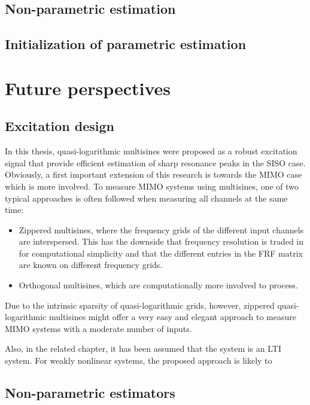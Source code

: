   \subsection{Non-parametric estimation}
  \subsection{Initialization of parametric estimation}


\section{Future perspectives}
  \subsection{Excitation design}
  In this thesis, quasi-logarithmic multisines were proposed as a robust excitation signal that provide efficient estimation of sharp resonance peaks in the \gls{SISO} case.
  Obviously, a first important extension of this research is towards the \gls{MIMO} case which is more involved.
  To measure \gls{MIMO} systems using multisines, one of two typical approaches is often followed when measuring all channels at the same time:
  \begin{itemize}
    \item Zippered multisines, where the frequency grids of the different input channels are interspersed. This has the downside that frequency resolution is traded in for computational simplicity and that the different entries in the \gls{FRF} matrix are known on different frequency grids.
    \item Orthogonal multisines, which are computationally more involved to process.
  \end{itemize}
  Due to the intrinsic sparsity of quasi-logarithmic grids, however, zippered quasi-logarithmic multisines might offer a very easy and elegant  approach to measure \gls{MIMO} systems with a moderate number of inputs.

  Also, in the related chapter, it has been assumed that the system is an \gls{LTI} system.
  For weakly nonlinear systems, the proposed approach is likely to 


  \subsection{Non-parametric estimators}

